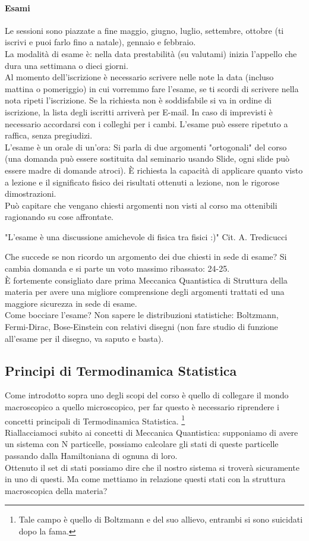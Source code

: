 \paragraph{Esami}%
Le sessioni sono piazzate a fine maggio, giugno, luglio, settembre, ottobre (ti iscrivi e puoi farlo fino a natale), gennaio e febbraio. \\
La modalità di esame è: nella data prestabilità (su valutami) inizia l'appello che dura una settimana o dieci giorni.\\
Al momento dell'iscrizione è necessario scrivere nelle note la data (incluso mattina o pomeriggio) in cui vorremmo fare l'esame, se ti scordi di scrivere nella nota ripeti l'iscrizione. Se la richiesta non è soddisfabile si va in ordine di iscrizione, la lista degli iscritti arriverà per E-mail. In caso di imprevisti è necessario accordarsi con i colleghi per i cambi. L'esame può essere ripetuto a raffica, senza pregiudizi.\\
L'esame è un orale di un'ora: Si parla di due argomenti "ortogonali" del corso (una domanda può essere sostituita dal seminario usando Slide, ogni slide può essere madre di domande atroci). È richiesta la  capacità di applicare quanto visto a lezione e il significato fisico dei risultati ottenuti a lezione, non le rigorose dimostrazioni. \\
Può capitare che vengano chiesti argomenti non visti al corso ma ottenibili ragionando su cose affrontate. 
\begin{center}
	"L'esame è una discussione amichevole di fisica tra fisici :)" \quad \quad Cit. A. Tredicucci
\end{center}
Che succede se non ricordo un argomento dei due chiesti in sede di esame? Si cambia domanda e si parte un voto massimo ribassato: 24-25.\\
È fortemente consigliato dare prima Meccanica Quantistica di Struttura della materia per avere una migliore comprensione degli argomenti trattati ed una maggiore sicurezza in sede di esame.\\
Come bocciare l'esame? Non sapere le distribuzioni statistiche: Boltzmann, Fermi-Dirac, Bose-Einstein con relativi disegni (non fare studio di funzione all'esame per il disegno, va saputo e basta).

\subsection{Principi di Termodinamica Statistica}
Come introdotto sopra uno degli scopi del corso è quello di collegare il mondo macroscopico a quello microscopico, per far questo è necessario riprendere i concetti principali di Termodinamica Statistica.
\footnote{Tale campo è quello di Boltzmann e del suo allievo, entrambi si sono suicidati dopo la fama.}\\
Riallacciamoci subito ai concetti di Meccanica Quantistica: supponiamo di avere un sistema con N particelle, possiamo calcolare gli stati di queste particelle passando dalla Hamiltoniana di ognuna di loro. \\
Ottenuto il set di stati possiamo dire che il nostro sistema si troverà sicuramente in uno di questi. Ma come mettiamo in relazione questi stati con la struttura macroscopica della materia?


